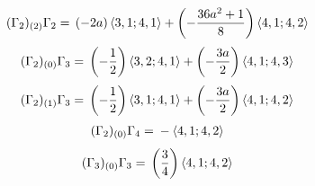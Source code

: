 \begin{align*}
(\Gamma_2)_{(2)}\Gamma_2 &={} \left(- 2 a\right)\langle 3,1;4,1\rangle + \left(- \frac{36 a^{2} + 1}{8}\right)\langle 4,1;4,2\rangle
\end{align*}
\begin{align*}
(\Gamma_2)_{(0)}\Gamma_3 &={} \left(- \frac{1}{2}\right)\langle 3,2;4,1\rangle + \left(- \frac{3 a}{2}\right)\langle 4,1;4,3\rangle
\end{align*}
\begin{align*}
(\Gamma_2)_{(1)}\Gamma_3 &={} \left(- \frac{1}{2}\right)\langle 3,1;4,1\rangle + \left(- \frac{3 a}{2}\right)\langle 4,1;4,2\rangle
\end{align*}
\begin{align*}
(\Gamma_2)_{(0)}\Gamma_4 &={} -\langle 4,1;4,2\rangle
\end{align*}
\begin{align*}
(\Gamma_3)_{(0)}\Gamma_3 &={} \left(\frac{3}{4}\right)\langle 4,1;4,2\rangle
\end{align*}


\endgroup
